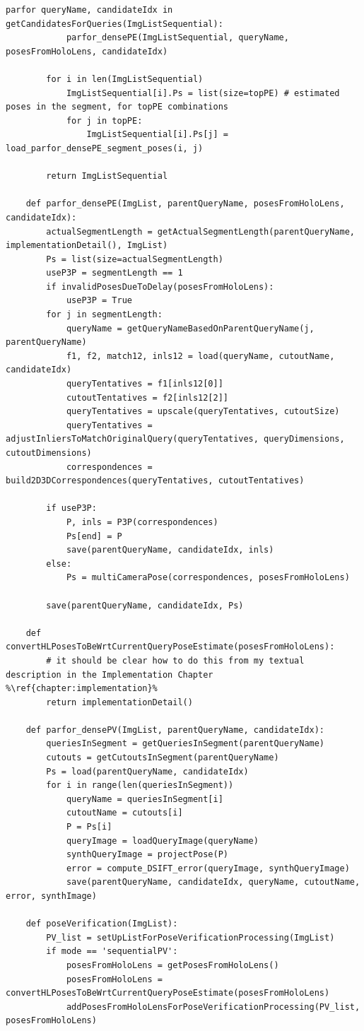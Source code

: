 \documentclass[twoside]{ctuthesis}
\theoremstyle{plain}
\theoremstyle{definition}
\theoremstyle{note}
\newcommand{\code}[1]{{\ttfamily #1%
}}
\begin{document}
\begin{lstlisting}[style=pseudocode, caption={\code{InLocCIIRC\_demo} pseudocode.}]
		parfor queryName, candidateIdx in getCandidatesForQueries(ImgListSequential):
			parfor_densePE(ImgListSequential, queryName, posesFromHoloLens, candidateIdx)

		for i in len(ImgListSequential)
			ImgListSequential[i].Ps = list(size=topPE) # estimated poses in the segment, for topPE combinations
			for j in topPE:
				ImgListSequential[i].Ps[j] = load_parfor_densePE_segment_poses(i, j)

		return ImgListSequential

	def parfor_densePE(ImgList, parentQueryName, posesFromHoloLens, candidateIdx):
		actualSegmentLength = getActualSegmentLength(parentQueryName, implementationDetail(), ImgList)
		Ps = list(size=actualSegmentLength)
		useP3P = segmentLength == 1
		if invalidPosesDueToDelay(posesFromHoloLens):
			useP3P = True
		for j in segmentLength:
			queryName = getQueryNameBasedOnParentQueryName(j, parentQueryName)
			f1, f2, match12, inls12 = load(queryName, cutoutName, candidateIdx)
			queryTentatives = f1[inls12[0]]
			cutoutTentatives = f2[inls12[2]]
			queryTentatives = upscale(queryTentatives, cutoutSize)
			queryTentatives = adjustInliersToMatchOriginalQuery(queryTentatives, queryDimensions, cutoutDimensions)
			correspondences = build2D3DCorrespondences(queryTentatives, cutoutTentatives)

		if useP3P:
			P, inls = P3P(correspondences)
			Ps[end] = P
			save(parentQueryName, candidateIdx, inls)
		else:
			Ps = multiCameraPose(correspondences, posesFromHoloLens)

		save(parentQueryName, candidateIdx, Ps)

	def convertHLPosesToBeWrtCurrentQueryPoseEstimate(posesFromHoloLens):
		# it should be clear how to do this from my textual description in the Implementation Chapter %\ref{chapter:implementation}%
		return implementationDetail()

	def parfor_densePV(ImgList, parentQueryName, candidateIdx):
		queriesInSegment = getQueriesInSegment(parentQueryName)
		cutouts = getCutoutsInSegment(parentQueryName)
		Ps = load(parentQueryName, candidateIdx)
		for i in range(len(queriesInSegment))
			queryName = queriesInSegment[i]
			cutoutName = cutouts[i]
			P = Ps[i]
			queryImage = loadQueryImage(queryName)
			synthQueryImage = projectPose(P)
			error = compute_DSIFT_error(queryImage, synthQueryImage)
			save(parentQueryName, candidateIdx, queryName, cutoutName, error, synthImage)

	def poseVerification(ImgList):
		PV_list = setUpListForPoseVerificationProcessing(ImgList)
		if mode == 'sequentialPV':
			posesFromHoloLens = getPosesFromHoloLens()
			posesFromHoloLens = convertHLPosesToBeWrtCurrentQueryPoseEstimate(posesFromHoloLens)
			addPosesFromHoloLensForPoseVerificationProcessing(PV_list, posesFromHoloLens)


\end{lstlisting}
\end{document}
